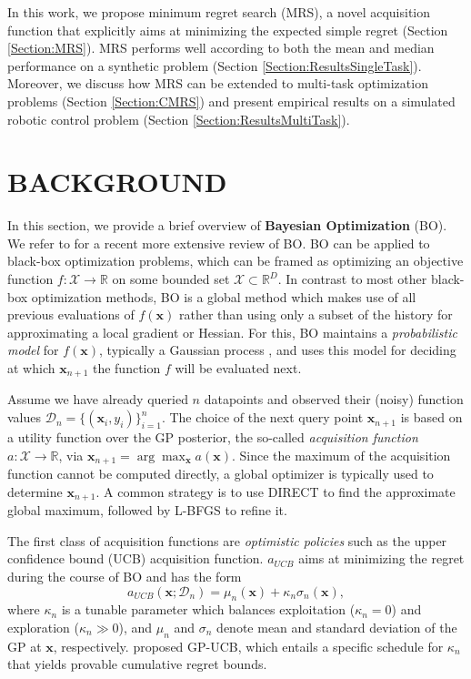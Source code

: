 \documentclass[10pt,letterpaper]{article} %
\begin{document}
In this work, we propose minimum regret search (MRS), a novel acquisition
function that explicitly aims at minimizing the expected simple regret
(Section \ref{Section:MRS}). MRS performs well according to both the mean and
median performance on a synthetic problem (Section
\ref{Section:ResultsSingleTask}). Moreover, we discuss how MRS can be extended
to multi-task optimization problems (Section \ref{Section:CMRS}) and present
empirical results on a simulated robotic control problem (Section
\ref{Section:ResultsMultiTask}).


\section{BACKGROUND} \label{Section:Background}

In this section, we provide a brief overview of
\textbf{Bayesian Optimization} (BO). We refer to \citet{shahriari_taking_2016} for a recent more
extensive review of BO. BO can be applied to black-box optimization
problems, which can be framed as optimizing an objective function $f:
\mathcal{X} \to \mathbb{R}$ on some bounded set $\mathcal X \subset
\mathbb{R}^D$. In contrast to most  other black-box optimization methods, BO is
a global method which makes use of all previous evaluations of $f(\mathbf{x})$
rather than using only a subset of the history for approximating a local
gradient or Hessian. For this, BO maintains a \emph{probabilistic model} for
$f(\mathbf{x})$, typically a Gaussian process \citep[GP,][]{rasmussen_gaussian_2006}, and uses this model for deciding
at which $\mathbf{x}_{n+1}$ the function $f$ will be evaluated next.

Assume we have already queried $n$ datapoints and observed their (noisy) function values $\mathcal{D}_n=\{(\mathbf{x}_i,
y_i)\}_{i=1}^n$. The choice of the next query point $\mathbf{x}_{n+1}$ is based
on a utility function over the GP posterior, the so-called \emph{acquisition
function} $a: \mathcal X \to \mathbb{R}$, via $\mathbf{x}_{n+1}=
\arg\max_\mathbf{x} a(\mathbf{x})$. Since the maximum of the acquisition
function cannot be computed directly, a global optimizer is typically
used to determine $\mathbf{x}_{n+1}$. A common strategy
is to use
DIRECT \citep{jones_lipschitzian_1993} to find the approximate global maximum,
followed by L-BFGS \citep{byrd_limited-memory_1995} to refine it.

The first class of acquisition functions are \emph{optimistic policies} such as
the upper confidence bound (UCB) acquisition function. $a_{UCB}$ aims at minimizing the regret during the course of BO and has the form $$a_{UCB}(\mathbf{x};
\mathcal{D}_n) = \mu_{n}(\mathbf{x}) + \kappa_n \sigma_{n}(\mathbf{x}),$$ where
$\kappa_n$ is a tunable parameter which balances exploitation ($\kappa_n = 0$) and
exploration ($\kappa_n \gg 0$), and $\mu_{n}$ and $\sigma_{n}$ denote mean and
standard deviation of the GP at $\mathbf{x}$, respectively.
\citet{srinivas_gaussian_2010} proposed GP-UCB, which entails a specific schedule for $\kappa_n$ that yields provable cumulative regret bounds.
\end{document}
